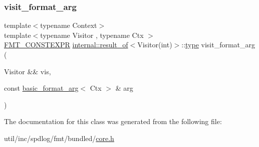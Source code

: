 \mbox{\label{classbasic__format__arg_a6b43571a7a4497973eda87872423bd13}} 
\subsubsection{\texorpdfstring{visit\+\_\+format\+\_\+arg}{visit\_format\_arg}}
{\footnotesize\ttfamily template$<$typename Context$>$ \\
template$<$typename Visitor , typename Ctx $>$ \\
\hyperlink{core_8h_a69201cb276383873487bf68b4ef8b4cd}{F\+M\+T\+\_\+\+C\+O\+N\+S\+T\+E\+X\+PR} \hyperlink{structinternal_1_1result__of}{internal\+::result\+\_\+of}$<$Visitor(int)$>$\+::\hyperlink{classbasic__format__arg_adf7349643b80568c84a5872b89b2f141}{type} visit\+\_\+format\+\_\+arg (\begin{DoxyParamCaption}\item[{Visitor \&\&}]{vis,  }\item[{const \hyperlink{classbasic__format__arg}{basic\+\_\+format\+\_\+arg}$<$ Ctx $>$ \&}]{arg }\end{DoxyParamCaption})\hspace{0.3cm}{\ttfamily [friend]}}



The documentation for this class was generated from the following file\+:\begin{DoxyCompactItemize}
\item 
util/inc/spdlog/fmt/bundled/\hyperlink{core_8h}{core.\+h}\end{DoxyCompactItemize}
